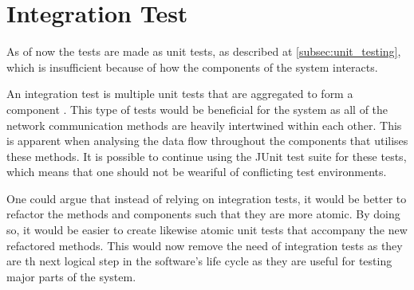 \section{Integration Test}\label{int_testing}
As of now the tests are made as unit tests, as described at \cref{subsec:unit_testing}, which is insufficient because of how the components of the system interacts.

An integration test is multiple unit tests that are aggregated to form a component \cite{msdn_it}. This type of tests would be beneficial for the system as all of the network communication methods are heavily intertwined within each other. This is apparent when analysing the data flow throughout the components that utilises these methods. It is possible to continue using the JUnit test suite for these tests, which means that one should not be weariful %
of conflicting test environments.

One could argue that instead of relying on integration tests, it would be better to refactor the methods and components such that they are more atomic. By doing so, it would be easier to create likewise atomic unit tests that accompany the new refactored methods. This would now remove the need of integration tests as they are th next logical step in the software's life cycle as they are useful for testing major parts of the system. 


